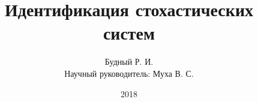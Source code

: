 \title{Идентификация стохастических систем}
\author{%
    \small{Будный Р. И.} \\
    \smallskip
    \scriptsize{Научный руководитель: Муха В. С.}
}

\date{2018}
